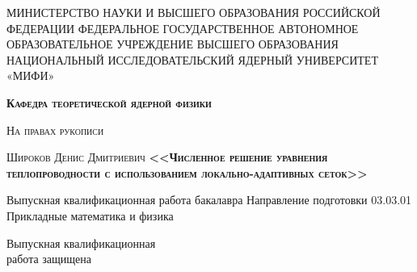 \begin{titlepage}
    \newpage
    
    \begin{center}
    МИНИСТЕРСТВО НАУКИ И ВЫСШЕГО ОБРАЗОВАНИЯ РОССИЙСКОЙ ФЕДЕРАЦИИ ФЕДЕРАЛЬНОЕ ГОСУДАРСТВЕННОЕ АВТОНОМНОЕ ОБРАЗОВАТЕЛЬНОЕ УЧРЕЖДЕНИЕ ВЫСШЕГО ОБРАЗОВАНИЯ НАЦИОНАЛЬНЫЙ ИССЛЕДОВАТЕЛЬСКИЙ ЯДЕРНЫЙ УНИВЕРСИТЕТ «МИФИ» \\
    \end{center}
    
    
    \vspace{2.5em} %
    
    \begin{center}
        \textsc{\textbf{Кафедра теоретической ядерной физики\\}}
    \end{center}
    \vspace{1em}
    \begin{center}
    \textsc{На правах рукописи\\} 
    \end{center}
    \begin{center}
        \textsc{\Large Широков Денис Дмитриевич\linebreak  \linebreak  \Large \textbf{ <<Численное решение уравнения теплопроводности с использованием локально-адаптивных сеток>>}}
    \end{center} 
    
    \vspace{1em}
    
    \begin{center}
    Выпускная квалификационная работа бакалавра \linebreak Направление подготовки 03.03.01 Прикладные математика и физика
    \end{center}
    
    \vspace{1em}
    
   
    \newbox{\lbox}
    \newlength{\maxl}
    \setlength{\maxl}{\wd\lbox}
    \hfill\parbox{9cm}{
    \hspace*{1.5cm}\hspace*{-3cm}Выпускная квалификационная\\ \hspace*{1.5cm}\hspace*{-3cm}работа защищена\\ 
    
}
\end{titlepage}
